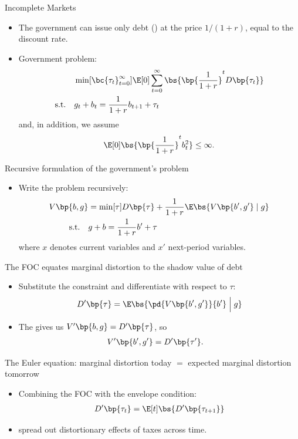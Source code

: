 \documentclass[11pt,xcolor={dvipsnames},aspectratio=159,hyperref={pdftex,pdfpagemode=UseNone,hidelinks,pdfdisplaydoctitle=true},usepdftitle=false]{beamer}
\begin{document}
    
    \begin{frame}{Incomplete Markets}
    \begin{itemize}
    \item The government can issue only  debt () at the price $1/\left(1+r\right)$,
    equal to the discount rate. 
    \item Government problem:
    \begin{align*}
     &  \min[\bc{\tau_t}_{t=0}^\infty] \E[0] \sum_{t=0}^\infty \bs{\bp{\frac{1}{1+r}}^t D\bp{\tau_t}}\\
    \text{s.t.}\quad & g_{t}+b_{t}=\frac{1}{1+r}b_{t+1}+\tau_{t}
    \end{align*}
    and, in addition, we assume 
    \[
        \E[0] \bs{\bp{\frac{1}{1+r}}^t b^2_t} \le \infty .
    \]
    \end{itemize}
    \end{frame}
    \begin{frame}{Recursive formulation of the government's problem}
    \begin{itemize}
    \item Write the problem recursively:
    \begin{align*}
    V\bp{b,g} & =\min[\tau] D\bp{\tau}+\frac{1}{1+r}\E\bs{V\bp{b',g'} \mid g }\\
    \text{s.t.}\quad & g+b=\frac{1}{1+r}b'+\tau
    \end{align*}
    where $x$ denotes current variables and $x'$ next-period variables.
    \end{itemize}
    \end{frame}
    \begin{frame}{The FOC equates marginal distortion to the shadow value of debt}
    \begin{itemize}
    \item Substitute the constraint and differentiate with respect to $\tau$:
    \[
    D'\bp{\tau}=\E\bs{\pd{V\bp{b',g'}}{b'} \mathrel{\Big|} g}   \]
    \item The  gives us $V'\bp{b,g}  =D'\bp{\tau}$, so
    \begin{align*}
    V'\bp{b',g'} & =D'\bp{\tau'}.
    \end{align*}
    \end{itemize}
    \end{frame}
    \begin{frame}{The Euler equation: marginal distortion today $=$ expected marginal distortion tomorrow}
    \begin{itemize}
    \item Combining the FOC with the envelope condition:
    \begin{align*}
        D'\bp{\tau_t}  =\E[t]\bs{D'\bp{\tau_{t+1}}}
    \end{align*}
    \item {} spread out distortionary effects of taxes across time.
    \end{itemize}
    \end{frame}
\end{document}
